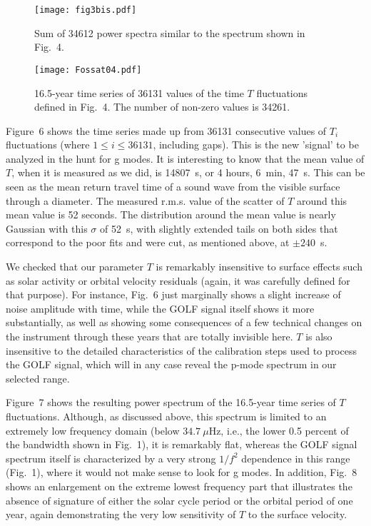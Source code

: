 \documentclass[bibyear]{aa}
\begin{document}
\begin{figure}
\centering
\texttt{[image: fig3bis.pdf]}
\caption{Sum of 34612 power spectra similar to the spectrum shown in Fig.~4.}
\label{fig:sum_of_ps}
\end{figure} 


\begin{figure}
\centering
\texttt{[image: Fossat04.pdf]}
\caption{16.5-year time series of 36131 values of the time $T$ fluctuations defined in Fig.~4. The number of non-zero values is 34261. }
\label{fig:T}
\end{figure} 

Figure~6 shows the time series made up from 36131 consecutive values of $T_i$ fluctuations (where $1\le i \le 36131$, including gaps). This is the new 'signal' to be analyzed in the hunt for g modes.  It is interesting to know that the mean value of $T$, when it is measured as  we did, is 14807~s, or 4 hours, 6~min, 47~s. This can be seen as the mean return travel time of a sound wave from the visible surface through a diameter. The measured r.m.s. value of the scatter of $T$ around this mean value is 52 seconds. The distribution around the mean value is nearly Gaussian with this $\sigma$ of 52~s, with slightly extended tails on both sides that correspond to the poor fits and were cut, as mentioned above, at $\pm 240$~s. 


We checked that our parameter $T$ is remarkably insensitive to surface effects such as solar activity or orbital velocity residuals (again, it was carefully defined for that purpose). For instance, Fig.~6 just marginally shows a slight increase of noise amplitude with time, while the GOLF signal itself shows it more substantially, as well as showing some consequences of a few technical changes on the instrument through these years that are totally invisible here. $T$ is also  insensitive to the detailed characteristics of the calibration steps used to process the GOLF signal, which will in any case reveal the p-mode spectrum in our selected range. 

Figure~7 shows the resulting power spectrum of the 16.5-year time series of $T$ fluctuations. Although, as discussed above, this spectrum is limited to an extremely low frequency domain (below $34.7\ \mu$Hz, i.e., the lower 0.5 percent of the bandwidth shown in Fig.~1), it is remarkably flat, whereas the GOLF signal spectrum itself is characterized by a very strong $1/f^2$ dependence in this range (Fig.~1), where it would not make sense to look for g modes. In addition, Fig.~8 shows an enlargement on the extreme lowest frequency part  that illustrates the absence of signature of either the solar cycle period or the orbital period of one year, again demonstrating the very low sensitivity of $T$ to the surface velocity.  
\end{document}
